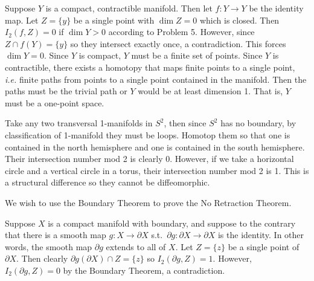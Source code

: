 \documentclass[12pt]{article}
\begin{document}
\begin{problem}[2.4.6]
Suppose $ Y$ is a compact, contractible manifold. Then let  $ f: Y \to Y$ be the identity map. Let $ Z = \{y\} $ be a single point with  $ \dim Z =0$ which is closed. Then $ I_2(f,Z) = 0$ if $ \dim Y>0$ according to Problem 5. However, since $ Z \cap f(Y) = \{y\} $ so they intersect exactly once, a contradiction. This forces $ \dim Y = 0$. Since $ Y$ is compact,  $ Y$ must be a finite set of points. Since  $ Y$ is contractible, there exists a homotopy that maps finite points to a single point,  \emph{i.e.} finite paths from points to a single point contained in the manifold. Then the paths must be the trivial path or $ Y$ would be at least dimension 1. That is, $ Y$ must be a one-point space.
\end{problem}

\begin{problem}[2.4.10]
Take any two transversal 1-manifolds in $ S^2$, then since $ S^2$ has no boundary, by classification of 1-manifold they must be loops. Homotop them so that one is contained in the north hemisphere and one is contained in the south hemisphere. Their intersection number mod 2 is clearly $ 0$. However, if we take a horizontal circle and a vertical circle in a torus, their intersection number mod 2 is 1. This is a structural difference so they cannot be diffeomorphic.
\end{problem}

\begin{problem}[2.4.17]
We wish to use the Boundary Theorem to prove the No Retraction Theorem.

Suppose $ X$ is a compact manifold with boundary, and suppose to the contrary that there is a smooth map  $ g: X \to \partial X$ s.t.\ $ \partial g: \partial X \to \partial X$ is the identity. In other words, the smooth map $ \partial g$ extends to all of $ X$. Let $ Z = \{z\} $ be a single point of $ \partial X$. Then clearly $ \partial g(\partial X) \cap Z = \{z\} $ so $ I_2(\partial g,Z)=1$. However, $ I_2( \partial g,Z) = 0$ by the Boundary Theorem, a contradiction.
\end{problem}
\end{document}
